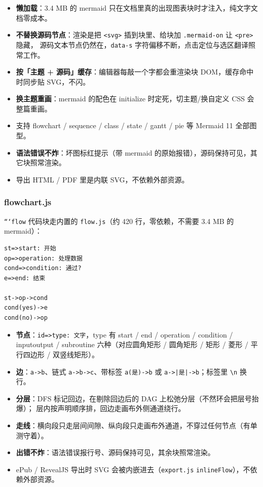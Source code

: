 \documentclass[11pt,a4paper]{ctexart}
\begin{document}
\begin{itemize}
\item \textbf{懒加载}：3.4 MB 的 mermaid 只在文档里真的出现图表块时才注入，纯文字文档零成本。
\item \textbf{不替换源码节点}：渲染是把 \texttt{\textless{}svg\textgreater{}} 插到块里、给块加 \texttt{.mermaid-on} 让 \texttt{\textless{}pre\textgreater{}} 隐藏，
源码文本节点仍然在，\texttt{data-s} 字符偏移不断，点击定位与选区翻译照常工作。
\item \textbf{按「主题 + 源码」缓存}：编辑器每敲一个字都会重渲染块 DOM，缓存命中时同步贴 SVG，不闪。
\item \textbf{换主题重画}：mermaid 的配色在 initialize 时定死，切主题/换自定义 CSS 会整篇重画。
\item 支持 flowchart / sequence / class / state / gantt / pie 等 Mermaid 11 全部图型。
\item \textbf{语法错误不炸}：坏图标红提示（带 mermaid 的原始报错），源码保持可见，其它块照常渲染。
\item 导出 HTML / PDF 里是内联 SVG，不依赖外部资源。
\end{itemize}


\subsubsection{flowchart.js}

\texttt{```flow} 代码块走内置的 \texttt{flow.js}（约 420 行，零依赖，不需要 3.4 MB 的 mermaid）：

\begin{verbatim}
st=>start: 开始
op=>operation: 处理数据
cond=>condition: 通过?
e=>end: 结束

st->op->cond
cond(yes)->e
cond(no)->op
\end{verbatim}

\begin{itemize}
\item \textbf{节点}：\texttt{id=\textgreater{}type: 文字}，type 有 start / end / operation / condition / inputoutput /
subroutine 六种（对应圆角矩形 / 圆角矩形 / 矩形 / 菱形 / 平行四边形 / 双竖线矩形）。
\item \textbf{边}：\texttt{a-\textgreater{}b}、链式 \texttt{a-\textgreater{}b-\textgreater{}c}、带标签 \texttt{a(是)-\textgreater{}b} 或 \texttt{a-\textgreater{}|是|-\textgreater{}b}；标签里 \texttt{\textbackslash{}n} 换行。
\item \textbf{分层}：DFS 标记回边，在剔除回边后的 DAG 上松弛分层（不然环会把层号抬爆）；
层内按声明顺序排，回边走画布外侧通道绕行。
\item \textbf{走线}：横向段只走层间间隙、纵向段只走画布外通道，不穿过任何节点（有单测守着）。
\item \textbf{出错不炸}：语法错误报行号、源码保持可见，其余块照常渲染。
\item ePub / RevealJS 导出时 SVG 会被内嵌进去（\texttt{export.js} \texttt{inlineFlow}），不依赖外部资源。
\end{itemize}
\end{document}
